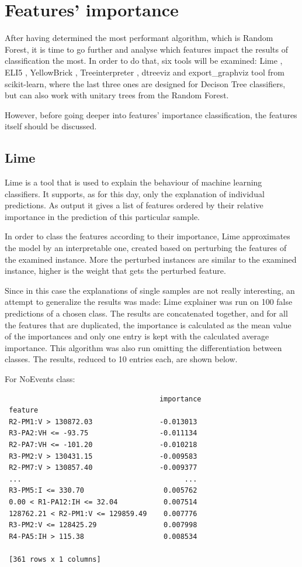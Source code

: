 \chapter{Features' importance}

After having determined the most performant algorithm, which is Random Forest, it is time to go further and analyse which features impact the results of classification the most. In order to do that, six tools will be examined: Lime \cite{lime}, ELI5 \cite{mikhail_korobov_eli5_nodate}, YellowBrick \cite{bengfort_yellowbrick_2018}, Treeinterpreter \cite{ando_saabas_treeinterpreter_nodate}, dtreeviz \cite{terence_parr_dtreeviz_nodate} and export\_graphviz tool from scikit-learn, where the last three ones are designed for Decison Tree classifiers, but can also work with unitary trees from the Random Forest.

However, before going deeper into features' importance classification, the features itself should be discussed. 

\section{Lime}
Lime is a tool that is used to explain the behaviour of machine learning classifiers. It supports, as for this day, only the explanation of individual predictions. As output it gives a list of features ordered by their relative importance in the prediction of this particular sample.

In order to class the features according to their importance, Lime approximates the model by an interpretable one, created based on perturbing the features of the examined instance. More the perturbed instances are similar to the examined instance, higher is the weight that gets the perturbed feature.

Since in this case the explanations of single samples are not really interesting, an attempt to generalize the results was made: Lime explainer was run on 100 false predictions of a chosen class. The results are concatenated together, and for all the features that are duplicated, the importance is calculated as the mean value of the importances and only one entry is kept with the calculated average importance. This algorithm was also run omitting the differentiation between classes. The results, reduced to 10 entries each, are shown below.

For NoEvents class:
\begin{verbatim}
                                     importance
 feature                                      
 R2-PM1:V > 130872.03                -0.013013
 R3-PA2:VH <= -93.75                 -0.011134
 R2-PA7:VH <= -101.20                -0.010218
 R3-PM2:V > 130431.15                -0.009583
 R2-PM7:V > 130857.40                -0.009377
 ...                                       ...
 R3-PM5:I <= 330.70                   0.005762
 0.00 < R1-PA12:IH <= 32.04           0.007514
 128762.21 < R2-PM1:V <= 129859.49    0.007776
 R3-PM2:V <= 128425.29                0.007998
 R4-PA5:IH > 115.38                   0.008534
 
 [361 rows x 1 columns]
\end{verbatim}

